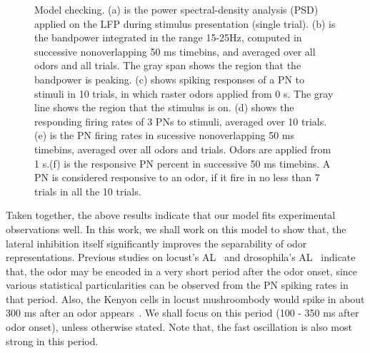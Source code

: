 \documentclass[12pt, a4paper]{article}
\begin{document}
\begin{figure}[htbp]
  \caption[Model]{\label{Figure1:model} \small Model checking. (a) is the power spectral-density analysis (PSD) applied on the LFP during stimulus presentation (single trial). (b) is the bandpower integrated in the range 15-25Hz, computed in successive nonoverlapping 50 ms timebins, and averaged over all odors and all trials. The gray span shows the region that the bandpower is peaking.
    (c) shows spiking responses of a PN to stimuli in 10 trials, in which raster odors applied from 0 s. The gray line shows the region that the stimulus is on. (d) shows the responding firing rates of 3 PNs to stimuli, averaged over 10 trials.
    (e) is the PN firing rates in sucessive nonoverlapping 50 ms timebins, averaged over all odors and trials. Odors are applied from 1 s.(f) is the responsive PN percent in successive 50 ms timebins. A PN is considered responsive to an odor, if it fire in no less than 7 trials in all the 10 trials. }
\end{figure}

Taken together, the above results indicate that our model fits experimental observations well. %
In this work, we shall work on this model to show that, the lateral inhibition itself significantly improves the separability of odor representations. Previous studies on locust's AL~\citep{} and drosophila's AL~\citep{} indicate that, the odor may be encoded in a very short period after the odor onset, since various statistical particularities can be observed from the PN spiking rates in that period. Also, the Kenyon cells in locust mushroombody would spike in about 300 ms after an odor appears~\citep{}. We shall focus on this period (100 - 350 ms after odor onset), unless otherwise stated. Note that, the fast oscillation is also most strong in this period.
\end{document}
